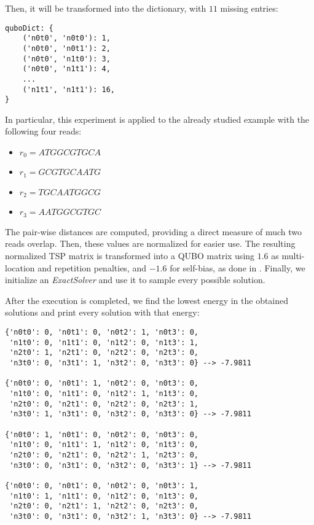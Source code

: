 Then, it will be transformed into the dictionary, with $11$ missing entries: 

\begin{verbatim}
quboDict: {
	('n0t0', 'n0t0'): 1,
	('n0t0', 'n0t1'): 2,
	('n0t0', 'n1t0'): 3,
	('n0t0', 'n1t1'): 4,
	...
	('n1t1', 'n1t1'): 16,
}
\end{verbatim}

In particular, this experiment is applied to the already studied example with the following four reads:

\begin{itemize}
	\item $r_0 = ATGGCGTGCA$
	\item $r_1 = GCGTGCAATG$
	\item $r_2 = TGCAATGGCG$
	\item $r_3 = AATGGCGTGC$
\end{itemize}

The pair-wise distances are computed, providing a direct measure of much two reads overlap. Then, these values are normalized for easier use. The resulting normalized TSP matrix is transformed into a QUBO matrix using $1.6$ as multi-location and repetition penalties, and $-1.6$ for self-bias, as done in \cite{Sarkar2020}. Finally, we initialize an \emph{ExactSolver} and use it to sample every possible solution.

After the execution is completed, we find the lowest energy in the obtained solutions and print every solution with that energy:

\begin{verbatim}
{'n0t0': 0, 'n0t1': 0, 'n0t2': 1, 'n0t3': 0,
 'n1t0': 0, 'n1t1': 0, 'n1t2': 0, 'n1t3': 1,
 'n2t0': 1, 'n2t1': 0, 'n2t2': 0, 'n2t3': 0,
 'n3t0': 0, 'n3t1': 1, 'n3t2': 0, 'n3t3': 0} --> -7.9811

{'n0t0': 0, 'n0t1': 1, 'n0t2': 0, 'n0t3': 0,
 'n1t0': 0, 'n1t1': 0, 'n1t2': 1, 'n1t3': 0, 
 'n2t0': 0, 'n2t1': 0, 'n2t2': 0, 'n2t3': 1, 
 'n3t0': 1, 'n3t1': 0, 'n3t2': 0, 'n3t3': 0} --> -7.9811

{'n0t0': 1, 'n0t1': 0, 'n0t2': 0, 'n0t3': 0,
 'n1t0': 0, 'n1t1': 1, 'n1t2': 0, 'n1t3': 0, 
 'n2t0': 0, 'n2t1': 0, 'n2t2': 1, 'n2t3': 0, 
 'n3t0': 0, 'n3t1': 0, 'n3t2': 0, 'n3t3': 1} --> -7.9811

{'n0t0': 0, 'n0t1': 0, 'n0t2': 0, 'n0t3': 1,
 'n1t0': 1, 'n1t1': 0, 'n1t2': 0, 'n1t3': 0,
 'n2t0': 0, 'n2t1': 1, 'n2t2': 0, 'n2t3': 0,
 'n3t0': 0, 'n3t1': 0, 'n3t2': 1, 'n3t3': 0} --> -7.9811
\end{verbatim}

